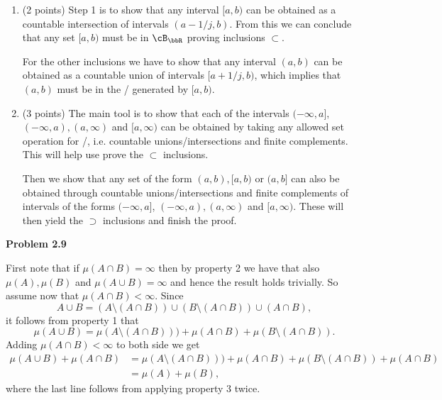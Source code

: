 \begin{enumerate}[label=(\alph*)]
For the other inclusion we consider a set $(a,b)$ with $a,b \in \bbQ$. Then by 6 we have that $(a,b) = \bigcup_{j \in \bbN} (a,b-1/j]$ where the later is a countable union of sets $(c,d]$ with $c,d \in \bbQ$ which must be in $\sigma(\cA_2)$ by definition of a \sigalg/. Hence, any interval $(a,b) \in \sigma(\cA_2)$ and we thus conclude, using 3, that
\[
	\cB_\bbR = \sigma(\cA_1) \subset \sigma(\cA_2) \subset \sigma(\cA_2^\prime) \subset \sigma(\cA_1^\prime) = \cB_\bbR,
\]
which implies the result.
\item (2 points) Step 1 is to show that any interval $[a,b)$ can be obtained as a countable intersection of intervals $(a-1/j,b)$. From this we can conclude that any set $[a,b)$ must be in $\cB_\bbR$ proving inclusions $\subset$.

For the other inclusions we have to show that any interval $(a,b)$ can be obtained as a countable union of intervals $[a+1/j, b)$, which implies that $(a,b)$ must be in the \sigalg/ generated by $[a,b)$. 
\item (3 points) The main tool is to show that each of the intervals $(-\infty, a],$ $(-\infty ,a), (a,\infty)$ and $[a,\infty)$ can be obtained by taking any allowed set operation for \sigalgs/, i.e. countable unions/intersections and finite complements. This will help use prove the $\subset$ inclusions. 

Then we show that any set of the form $(a,b), [a,b)$ or $(a,b]$ can also be obtained through countable unions/intersections and finite complements of intervals of the forms $(-\infty, a]$, $(-\infty ,a), (a,\infty)$ and $[a,\infty)$. These will then yield the $\supset$ inclusions and finish the proof.
\end{enumerate}

\bigskip

\textbf{Problem 2.9}

First note that if $\mu(A \cap B) = \infty$ then by property 2 we have that also $\mu(A), \mu(B)$ and $\mu(A \cup B) = \infty$ and hence the result holds trivially. So assume now that $\mu(A \cap B) < \infty$. Since 
\[
	A \cup B = (A \setminus (A\cap B)) \cup (B \setminus (A \cap B)) \cup (A \cap B),
\] 
it follows from property 1 that
\[
	\mu(A \cup B) = \mu(A \setminus (A \cap B))) + \mu(A \cap B) + \mu(B \setminus (A \cap B)).
\] 
Adding $\mu(A \cap B) < \infty$ to both side we get
\begin{align*}
	\mu(A \cup B) + \mu(A \cap B) 
	&= \mu(A \setminus (A \cap B))) + \mu(A \cap B) + \mu(B \setminus (A \cap B)) + \mu(A \cap B)\\
	&= \mu(A) + \mu(B), 
\end{align*}
where the last line follows from applying property 3 twice.  
 
